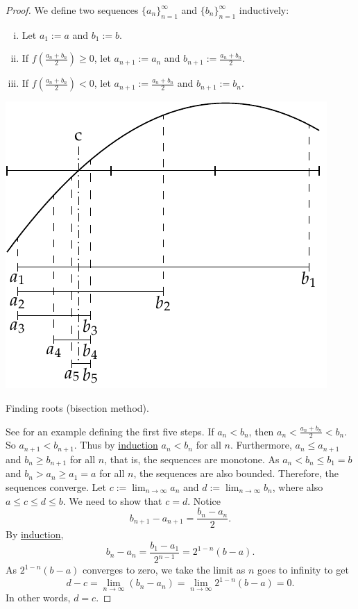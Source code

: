 \begin{proof}
We define two sequences $\{ a_n \}_{n=1}^\infty$
and $\{ b_n \}_{n=1}^\infty$ inductively:
\begin{enumerate}[(i)]
\item Let $a_1 := a$ and $b_1 := b$.
\item If $f\left(\frac{a_n+b_n}{2}\right) \geq 0$, let $a_{n+1} := a_n$ and
$b_{n+1} := \frac{a_n+b_n}{2}$.
\item If $f\left(\frac{a_n+b_n}{2}\right) < 0$, let $a_{n+1} := \frac{a_n+b_n}{2}$ and
$b_{n+1} := b_n$.
\end{enumerate}
\begin{myfigureht}
\includegraphics{figures/bisect}
\caption{Finding roots (bisection method).\label{bisectfig}}
\end{myfigureht}
See  for an example defining the first five steps.
If $a_n < b_n$, then $a_n < \frac{a_n+b_n}{2} < b_n$.  So
$a_{n+1} < b_{n+1}$.
Thus by \hyperref[induction:thm]{induction} $a_n < b_n$ for all $n$.
Furthermore, $a_n \leq a_{n+1}$ and 
$b_n \geq b_{n+1}$ for all $n$, that is, the sequences are monotone.
As $a_n < b_n \leq b_1 = b$ and 
$b_n > a_n \geq a_1 = a$ for all $n$,
the sequences are also bounded.  Therefore, the
sequences converge.
Let $c := \lim_{n\to\infty} a_n$ and $d := \lim_{n\to\infty} b_n$,
where also $a \leq c \leq d \leq b$.  We need
to show that $c=d$.
Notice
\begin{equation*}
b_{n+1} - a_{n+1} = \frac{b_n-a_n}{2}.
\end{equation*}
By \hyperref[induction:thm]{induction},
\begin{equation*}
b_n - a_n = \frac{b_1-a_1}{2^{n-1}} = 2^{1-n} (b-a) .
\end{equation*}
As $2^{1-n}(b-a)$ converges to zero, we take the limit as $n$ goes to
infinity to get
\begin{equation*}
d-c = \lim_{n\to\infty} (b_n - a_n) =
\lim_{n\to\infty} 2^{1-n} (b-a) = 0.
\end{equation*}
In other words, $d=c$.


\end{proof}
